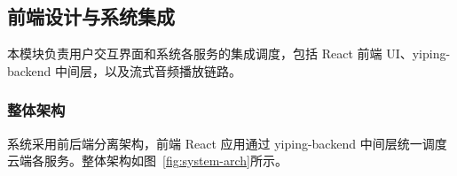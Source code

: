 \documentclass[12pt,a4paper]{article}
\begin{document}
\subsection{前端设计与系统集成}
\label{sec:frontend}

本模块负责用户交互界面和系统各服务的集成调度，包括 React 前端 UI、yiping-backend 中间层，以及流式音频播放链路。

\subsubsection{整体架构}

系统采用前后端分离架构，前端 React 应用通过 yiping-backend 中间层统一调度云端各服务。整体架构如图~\ref{fig:system-arch}所示。
\end{document}
